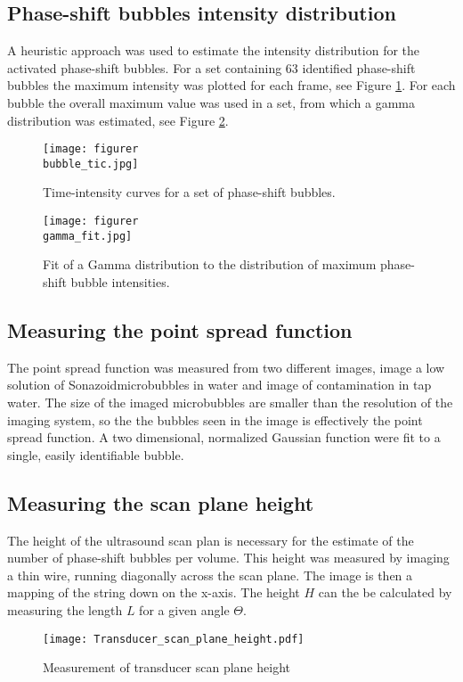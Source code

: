 \subsection{Phase-shift bubbles intensity distribution}
A heuristic approach was used to estimate the intensity distribution for the activated phase-shift bubbles. For a set containing 63 identified phase-shift bubbles the maximum intensity was plotted for each frame, see Figure \ref{Fig:bubble_tic}. For each bubble the overall maximum value was used in a set, from which a gamma distribution was estimated, see Figure \ref{Fig:gamma_fit}.

\begin{figure}[h]
  \centering
  \label{Fig:bubble_tic}
  \texttt{[image: figurer\\bubble\_tic.jpg]}
  \caption{Time-intensity curves for a set of phase-shift bubbles.}
\end{figure}
\begin{figure}[h]
  \centering
  \label{Fig:gamma_fit}
  \texttt{[image: figurer\\gamma\_fit.jpg]}
  \caption{Fit of a Gamma distribution to the distribution of maximum phase-shift bubble intensities.}
\end{figure}

\subsection*{Measuring the point spread function}
The point spread function was measured from two different images, image a low solution of Sonazoid\texttrademark microbubbles in water and image of contamination in tap water. The size of the imaged microbubbles are smaller than the resolution of the imaging system, so the the bubbles seen in the image is effectively the point spread function. A two dimensional, normalized Gaussian function were fit to a single, easily identifiable bubble. 

 
\subsection*{Measuring the scan plane height}
The height of the ultrasound scan plan is necessary for the estimate of the number of phase-shift bubbles per volume. This height was measured by imaging a thin wire, running diagonally across the scan plane. The image is then a mapping of the string down on the x-axis. The height $H$ can the be calculated by measuring the length $L$ for a given angle $\Theta$.

\begin{figure}[h]
  \centering
  \texttt{[image: Transducer\_scan\_plane\_height.pdf]}
  \caption{Measurement of transducer scan plane height}
\end{figure}


